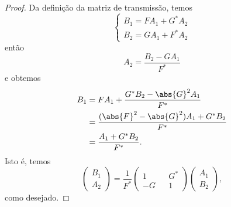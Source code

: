 \begin{proof}
    Da definição da matriz de transmissão, temos
    \begin{equation*}
        \begin{cases}
            B_1 = F A_1 + G^* A_2\\
            B_2 = G A_1 + F^* A_2
        \end{cases}
    \end{equation*}
    então
    \begin{equation*}
        A_2 = \frac{B_2 - G A_1}{F^*}
    \end{equation*}
    e obtemos
    \begin{align*}
        B_1 &= F A_1 + \frac{G^* B_2 - \abs{G}^2A_1}{F^*}\\
            &= \frac{(\abs{F}^2 - \abs{G}^2)A_1 + G^* B_2}{F^*}\\
            &= \frac{A_1 + G^* B_2}{F^*}.
    \end{align*}
    Isto é, temos
    \begin{equation*}
        \begin{pmatrix}
            B_1\\A_2
        \end{pmatrix} = \frac{1}{F^*}
        \begin{pmatrix}
            1 && G^*\\
            -G&& 1
        \end{pmatrix}
        \begin{pmatrix}
            A_1\\B_2
        \end{pmatrix},
    \end{equation*}
    como desejado.
\end{proof}
